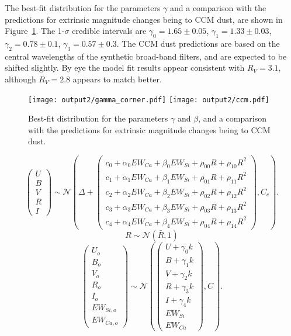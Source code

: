 \documentclass[11pt, oneside]{article}   	%
\begin{document}
The best-fit distribution for the parameters $\gamma$  and a comparison with the predictions for extrinsic
magnitude changes being to CCM dust, are shown in Figure~\ref{gamma:fig}.  The 1-$\sigma$ 
credible intervals are $\gamma_0=1.65 \pm 0.05$,
$\gamma_1 = 1.33  \pm 0.03$, $\gamma_2 = 0.78  \pm 0.1$, $\gamma_3 = 0.57  \pm 0.3$.
The CCM dust predictions are based 
on the central wavelengths of the synthetic broad-band filters, and are expected to be shifted slightly.
By eye the model fit results appear consistent with $R_V=3.1$, although $R_V=2.8$ appears to match better.
\begin{figure}[htbp] %
   \centering
   \texttt{[image: output2/gamma\_corner.pdf]} 
   \texttt{[image: output2/ccm.pdf]} 
   \caption{Best-fit distribution for the parameters $\gamma$ and $\beta$, and a comparison with the predictions for extrinsic
magnitude changes being to CCM dust.}
   \label{gamma:fig}
\end{figure}

\begin{equation*}
\left(
\begin{matrix}
U\\B\\V\\R\\I
\end{matrix}
\right) \sim \mathcal{N}
\left(
\Delta +
\left(
\begin{matrix}
c_0+\alpha_0 EW_{Ca} + \beta_0 EW_{Si} +\rho_{00} R +\rho_{10} R^2\\
c_1+\alpha_1 EW_{Ca} + \beta_1 EW_{Si} +\rho_{01} R  +\rho_{11} R^2\\
c_2+\alpha_2 EW_{Ca} + \beta_2 EW_{Si} +\rho_{02} R +\rho_{12} R^2\\
c_3+\alpha_3 EW_{Ca} + \beta_3 EW_{Si} +\rho_{03} R +\rho_{13} R^2\\
c_4+\alpha_4 EW_{Ca} + \beta_4 EW_{Si}+\rho_{04} R +\rho_{14} R^2
\end{matrix}
\right)
,C_{c}
\right).
\end{equation*}
\begin{equation*}
R \sim \mathcal{N}(\bar{R},1)
\end{equation*}
\begin{equation*}
\left(
\begin{matrix}
U_o\\B_o\\ V_o\\R_o\\I_o\\EW_{Si, o}\\ EW_{Ca, o}
\end{matrix}
\right) \sim \mathcal{N}
\left(
\left(
\begin{matrix}
U +\gamma_0 k \\B +\gamma_1 k \\V+\gamma_2 k\\R+\gamma_3 k\\I+\gamma_4 k\\
EW_{Si}\\ EW_{Ca}
\end{matrix}
\right)
,C
\right).
\end{equation*}
\end{document}
